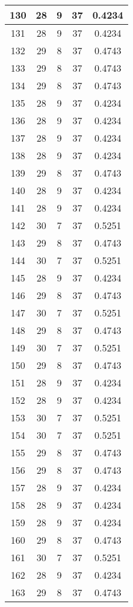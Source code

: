 \documentclass[letterpaper, 12pt]{article}
\begin{document}
\begin{longtable}{|c|c|c|c|c|}
\hline
130 & 28 & 9 & 37 & 0.4234 \\
\hline
131 & 28 & 9 & 37 & 0.4234 \\
\hline
132 & 29 & 8 & 37 & 0.4743 \\
\hline
133 & 29 & 8 & 37 & 0.4743 \\
\hline
134 & 29 & 8 & 37 & 0.4743 \\
\hline
135 & 28 & 9 & 37 & 0.4234 \\
\hline
136 & 28 & 9 & 37 & 0.4234 \\
\hline
137 & 28 & 9 & 37 & 0.4234 \\
\hline
138 & 28 & 9 & 37 & 0.4234 \\
\hline
139 & 29 & 8 & 37 & 0.4743 \\
\hline
140 & 28 & 9 & 37 & 0.4234 \\
\hline
141 & 28 & 9 & 37 & 0.4234 \\
\hline
142 & 30 & 7 & 37 & 0.5251 \\
\hline
143 & 29 & 8 & 37 & 0.4743 \\
\hline
144 & 30 & 7 & 37 & 0.5251 \\
\hline
145 & 28 & 9 & 37 & 0.4234 \\
\hline
146 & 29 & 8 & 37 & 0.4743 \\
\hline
147 & 30 & 7 & 37 & 0.5251 \\
\hline
148 & 29 & 8 & 37 & 0.4743 \\
\hline
149 & 30 & 7 & 37 & 0.5251 \\
\hline
150 & 29 & 8 & 37 & 0.4743 \\
\hline
151 & 28 & 9 & 37 & 0.4234 \\
\hline
152 & 28 & 9 & 37 & 0.4234 \\
\hline
153 & 30 & 7 & 37 & 0.5251 \\
\hline
154 & 30 & 7 & 37 & 0.5251 \\
\hline
155 & 29 & 8 & 37 & 0.4743 \\
\hline
156 & 29 & 8 & 37 & 0.4743 \\
\hline
157 & 28 & 9 & 37 & 0.4234 \\
\hline
158 & 28 & 9 & 37 & 0.4234 \\
\hline
159 & 28 & 9 & 37 & 0.4234 \\
\hline
160 & 29 & 8 & 37 & 0.4743 \\
\hline
161 & 30 & 7 & 37 & 0.5251 \\
\hline
162 & 28 & 9 & 37 & 0.4234 \\
\hline
163 & 29 & 8 & 37 & 0.4743 \\

\end{longtable}
\end{document}
